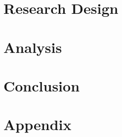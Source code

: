 \documentclass[11pt, a4paper]{article} %
\begin{document}

\section{Research Design}

\blindtext %


\section{Analysis}

\blindtext %


\section{Conclusion}

\blindtext %

\newpage %

%



\newpage %
\section*{Appendix} %
\end{document}

